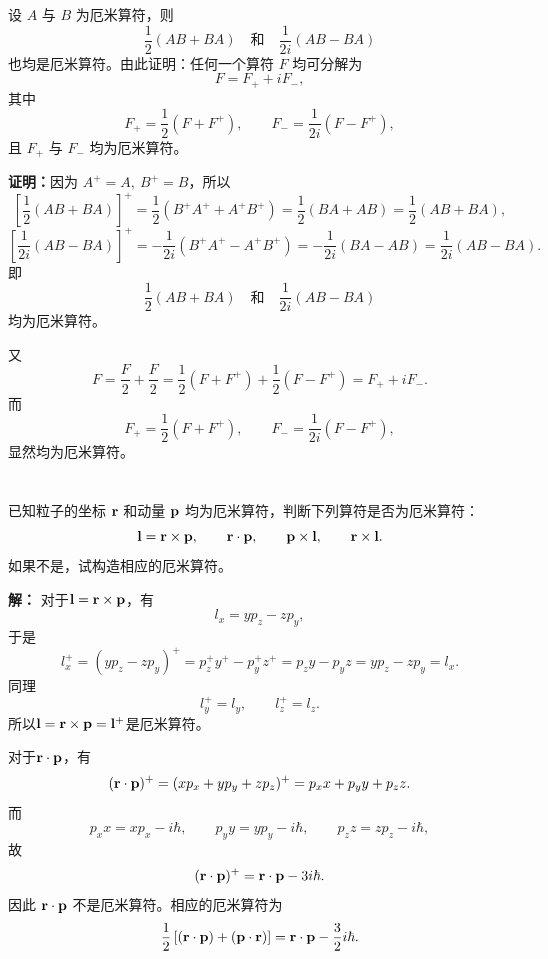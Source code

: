 \documentclass[12pt,a4paper]{article}
\begin{document}
\maketitle

\section{}
设 \(A\) 与 \(B\) 为厄米算符，则
\[
\frac{1}{2}(AB+BA)
\quad \text{和} \quad
\frac{1}{2i}(AB-BA)
\]
也均是厄米算符。由此证明：任何一个算符 \(F\) 均可分解为
\[
F = F_{+} + iF_{-},
\]
其中
\[
F_{+} = \frac{1}{2}(F+F^{+}), 
\qquad
F_{-} = \frac{1}{2i}(F-F^{+}),
\]
且 \(F_{+}\) 与 \(F_{-}\) 均为厄米算符。

\vspace{0.5cm}


\noindent\textbf{证明：}因为 \(A^{+}=A,\ B^{+}=B\)，所以
\[
\left[\frac{1}{2}(AB+BA)\right]^{+}
=
\frac{1}{2}(B^{+}A^{+}+A^{+}B^{+})
=
\frac{1}{2}(BA+AB)
=
\frac{1}{2}(AB+BA),
\]
\[
\left[\frac{1}{2i}(AB-BA)\right]^{+}
=
-\frac{1}{2i}(B^{+}A^{+}-A^{+}B^{+})
=
-\frac{1}{2i}(BA-AB)
=
\frac{1}{2i}(AB-BA).
\]
即
\[
\frac{1}{2}(AB+BA)
\quad \text{和} \quad
\frac{1}{2i}(AB-BA)
\]
均为厄米算符。

又
\[
F=\frac{F}{2}+\frac{F}{2}
=\frac{1}{2}(F+F^{+})+\frac{1}{2}(F-F^{+})
=F_{+}+iF_{-}.
\]
而
\[
F_{+}=\frac{1}{2}(F+F^{+}),
\qquad
F_{-}=\frac{1}{2i}(F-F^{+}),
\]
显然均为厄米算符。

\section{}
已知粒子的坐标 \(\vb{r}\) 和动量 \(\vb{p}\) 均为厄米算符，判断下列算符是否为厄米算符：
\[
\vb{l}=\vb{r}\times\vb{p},\qquad
\vb{r}\cdot\vb{p},\qquad
\vb{p}\times\vb{l},\qquad
\vb{r}\times\vb{l}.
\]
如果不是，试构造相应的厄米算符。

\vspace{0.5cm}

\noindent\textbf{解：}
对于\(\vb{l}=\vb{r}\times\vb{p}\)，有
\[
l_x=yp_z-zp_y,
\]
于是
\[
l_x^{+}
=
(yp_z-zp_y)^{+}
=
p_z^{+}y^{+}-p_y^{+}z^{+}
=
p_zy-p_yz
=
yp_z-zp_y
=
l_x.
\]
同理
\[
l_y^{+}=l_y,\qquad l_z^{+}=l_z.
\]
所以\(\vb{l}=\vb{r}\times\vb{p}=\vb{l}^{+}\)是厄米算符。

对于\(\vb{r}\cdot\vb{p}\)，有
\[
(\vb{r}\cdot\vb{p})^{+}
=
(xp_x+yp_y+zp_z)^{+}
=
p_xx+p_yy+p_zz.
\]
而
\[
p_xx=xp_x-i\hbar,\qquad
p_yy=yp_y-i\hbar,\qquad
p_zz=zp_z-i\hbar,
\]
故
\[
(\vb{r}\cdot\vb{p})^{+}
=
\vb{r}\cdot\vb{p}-3i\hbar.
\]
因此 \(\vb{r}\cdot\vb{p}\) 不是厄米算符。相应的厄米算符为
\[
\frac{1}{2}\left[(\vb{r}\cdot\vb{p})+(\vb{p}\cdot\vb{r})\right]
=
\vb{r}\cdot\vb{p}-\frac{3}{2}i\hbar.
\]
\end{document}
